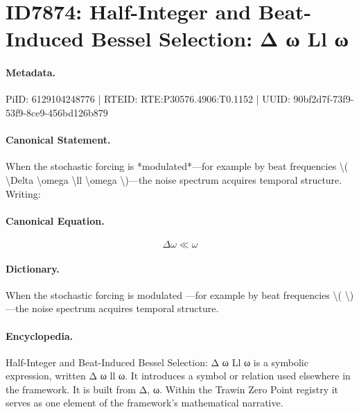 \section*{ID7874: Half-Integer and Beat-Induced Bessel Selection: Δ ω Ll ω}
\paragraph{Metadata.}
PiID: 6129104248776 | RTEID: RTE:P30576.4906:T0.1152 | UUID: 90bf2d7f-73f9-53f9-8ce9-456bd126b879

\paragraph{Canonical Statement.}
When the stochastic forcing is *modulated*—for example by beat frequencies \textbackslash{}( \textbackslash{}Delta \textbackslash{}omega \textbackslash{}ll \textbackslash{}omega \textbackslash{})—the noise spectrum acquires temporal structure. Writing:

\paragraph{Canonical Equation.}
\[
\Delta \omega \ll \omega
\]

\paragraph{Dictionary.}
When the stochastic forcing is modulated —for example by beat frequencies \textbackslash{}( \textbackslash{})—the noise spectrum acquires temporal structure.

\paragraph{Encyclopedia.}
Half-Integer and Beat-Induced Bessel Selection: Δ ω Ll ω is a symbolic expression, written Δ ω ll ω. It introduces a symbol or relation used elsewhere in the framework. It is built from Δ, ω. Within the Trawin Zero Point registry it serves as one element of the framework's mathematical narrative.
